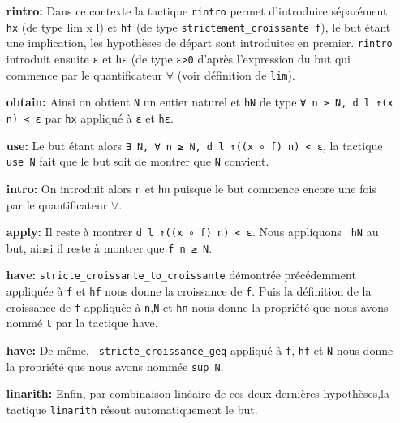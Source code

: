 \documentclass[a4paper, 12pt]{article}
\newcommand{\lean}[1]{\texttt{#1}}
\begin{document}
\begin{itemize}[align=left,itemsep=20pt]
    \item [\textbf{rintro:}] Dans ce contexte la tactique \lean{rintro} permet d'introduire séparément \lean{hx} (de type lim x l) et \lean{hf} (de type \lean{strictement_croissante
    f}), le but étant une implication, les hypothèses de départ sont introduites en premier. \lean{rintro} introduit ensuite \lean{ε} et \lean{hε} (de type \lean{ε>0} d'après
    l'expression du but qui commence par le quantificateur $\forall$ (voir définition de \lean{lim}).

    \item [\textbf{obtain:}] Ainsi on obtient \lean{N} un entier naturel et \lean{hN} de type \lean{∀ n ≥ N, d l ↑(x n) < ε} par \lean{hx} appliqué à \lean{ε} et \lean{hε}.

    \item [\textbf{use:}] Le but étant alors \lean{∃ N, ∀ n ≥ N, d l ↑((x ∘ f) n) < ε}, la tactique \lean{ use N} fait que le but soit de montrer que \lean{N} convient.

    \item [\textbf{intro:}] On introduit alors \lean{n} et \lean{hn} puisque le but commence encore une fois par le quantificateur $\forall$.

    \item [\textbf{apply:}] Il reste à montrer \lean{d l ↑((x ∘ f) n) < ε}. Nous appliquons \lean{ hN} au but, ainsi il reste à montrer que \lean{f n ≥ N}.

    \item [\textbf{have:}] \lean{stricte_croissante_to_croissante} démontrée précédemment appliquée à \lean{f} et \lean{hf} nous donne la croissance de \lean{f}. Puis la définition de
    la croissance de \lean{f} appliquée à \lean{n},\lean{N} et \lean{hn} nous donne la propriété que nous avons nommé \lean{t} par la tactique have.

    \item [\textbf{have:}] De même, \lean{ stricte_croissance_geq} appliqué à \lean{f}, \lean{hf} et \lean{N} nous donne la propriété que nous avons nommée \lean{sup_N}.

    \item [\textbf{linarith:}] Enfin, par combinaison linéaire de ces deux dernières hypothèses,la tactique \lean{linarith} résout automatiquement le but.

\end{itemize}

\vspace{\baselineskip}
\vspace{\baselineskip}
\end{document}
